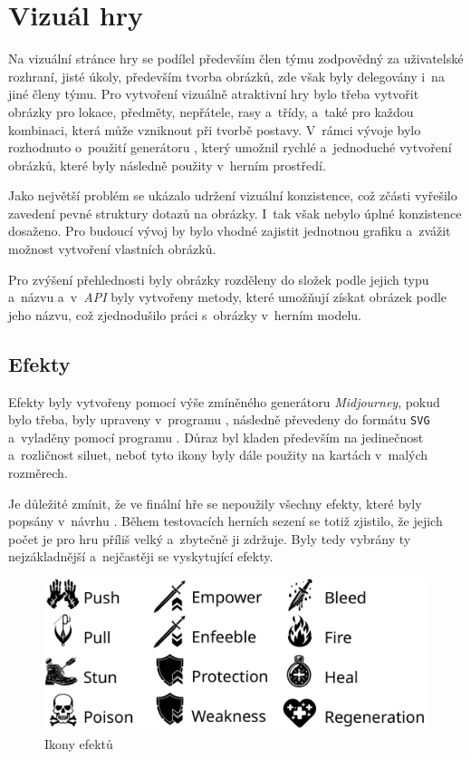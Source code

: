 \section{Vizuál hry}
\label{subsec:game_visuals}

Na vizuální stránce hry se podílel především člen týmu zodpovědný za uživatelské rozhraní, jisté úkoly, především tvorba obrázků, zde však byly delegovány i~na jiné členy týmu. Pro vytvoření vizuálně atraktivní hry bylo třeba vytvořit obrázky pro lokace, předměty, nepřátele, rasy a~třídy, a~také pro každou kombinaci, která může vzniknout při tvorbě postavy. V~rámci vývoje bylo rozhodnuto o~použití generátoru , který umožnil rychlé a~jednoduché vytvoření obrázků, které byly následně použity v~herním prostředí.

Jako největší problém se ukázalo udržení vizuální konzistence, což zčásti vyřešilo zavedení pevné struktury dotazů na obrázky. I~tak však nebylo úplné konzistence dosaženo. Pro budoucí vývoj by bylo vhodné zajistit jednotnou grafiku a~zvážit možnost vytvoření vlastních obrázků.

Pro zvýšení přehlednosti byly obrázky rozděleny do složek podle jejich typu a~názvu a~v~\textit{API} byly vytvořeny metody, které umožňují získat obrázek podle jeho názvu, což zjednodušilo práci s~obrázky v~herním modelu.

\subsection{Efekty}
\label{subsec:effects}

Efekty  byly vytvořeny pomocí výše zmíněného generátoru \textit{Midjourney}, pokud bylo třeba, byly upraveny v~programu , následně převedeny do formátu \texttt{SVG} a~vyladěny pomocí programu . Důraz byl kladen především na jedinečnost a~rozličnost siluet, neboť tyto ikony byly dále použity na kartách v~malých rozměrech.

Je důležité zmínit, že ve finální hře se nepoužily všechny efekty, které byly popsány v~návrhu . Během testovacích herních sezení se totiž zjistilo, že jejich počet je pro hru příliš velký a~zbytečně ji zdržuje. Byly tedy vybrány ty nejzákladnější a~nejčastěji se vyskytující efekty.

\begin{figure}[H]
    \centering
    \includegraphics[scale=0.7]{figures/images/effects.pdf}
    \caption{Ikony efektů}
    \label{fig:effects}
\end{figure}

